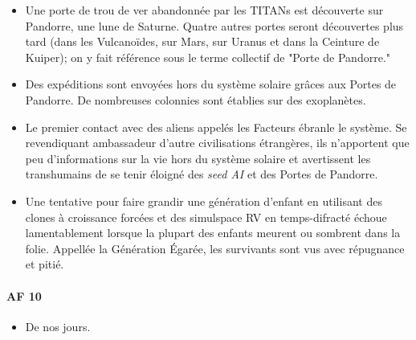 \documentclass[a4paper,9pt]{article}
\begin{document}
\begin{multicols}{3}
\begin{itemize} 
   \item Une porte de trou de ver abandonnée par les TITANs est découverte sur
      Pandorre, une lune de Saturne. Quatre autres portes seront découvertes
      plus tard (dans les Vulcanoïdes, sur Mars, sur Uranus et dans la Ceinture
      de Kuiper); on y fait référence sous le terme collectif de "Porte de
      Pandorre." 
   \item Des expéditions sont envoyées hors du système solaire grâces aux
      Portes de Pandorre. De nombreuses colonnies sont établies sur des
      exoplanètes. 
   \item Le premier contact avec des aliens appelés les Facteurs ébranle le
      système. Se revendiquant ambassadeur d'autre civilisations étrangères,
      ils n'apportent que peu d'informations sur la vie hors du système solaire
      et avertissent les transhumains de se tenir éloigné des \textit{seed AI}
      et des Portes de Pandorre. 
   \item Une tentative pour faire grandir une génération d'enfant en utilisant
      des clones à croissance forcées et des simulspace RV en temps-difracté
      échoue lamentablement lorsque la plupart des enfants meurent ou sombrent
      dans la folie. Appellée la Génération Égarée, les survivants sont vus
      avec répugnance et pitié.
\end{itemize}

\paragraph{AF 10}

\begin{itemize} 
   \item De nos jours.
\end{itemize} 

\normalsize

\end{multicols}
\end{document}

